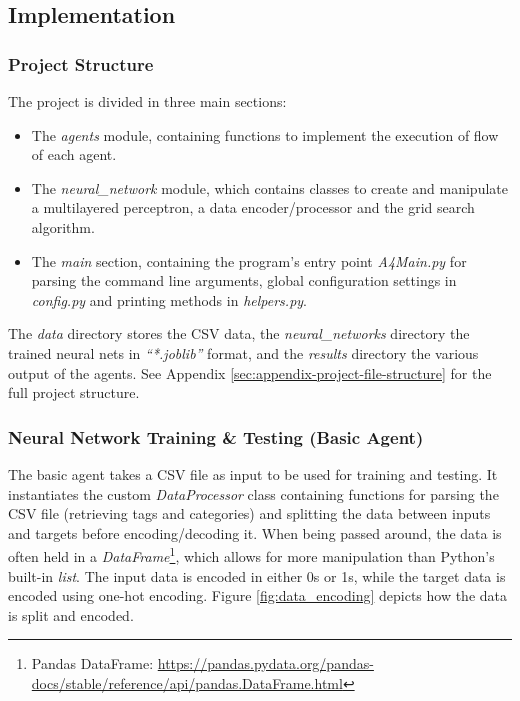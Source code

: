 \documentclass[letterpaper,12pt]{article}
\begin{document}

\subsection{Implementation}

\subsubsection{Project Structure}

The project is divided in three main sections:

\begin{itemize}
    \item The \textit{agents} module, containing functions to implement the execution of flow of each agent.
    \item The \textit{neural\_network} module, which contains classes to create and manipulate a multilayered perceptron, a data encoder/processor and the grid search algorithm.
    \item The \textit{main} section, containing the program's entry point \textit{A4Main.py} for parsing the command line arguments, global configuration settings in \textit{config.py} and printing methods in \textit{helpers.py}.
\end{itemize}

The \textit{data} directory stores the CSV data, the \textit{neural\_networks} directory the trained neural nets in \textit{``*.joblib''} format, and the \textit{results} directory the various output of the agents. See Appendix \ref{sec:appendix-project-file-structure} for the full project structure.


\subsubsection{Neural Network Training \& Testing (Basic Agent)}
\label{sec:basic-agent}

The basic agent takes a CSV file as input to be used for training and testing. It instantiates the custom \textit{DataProcessor} class containing functions for parsing the CSV file (retrieving tags and categories) and splitting the data between inputs and targets before encoding/decoding it. When being passed around, the data is often held in a \textit{DataFrame}\footnote{Pandas DataFrame: \url{https://pandas.pydata.org/pandas-docs/stable/reference/api/pandas.DataFrame.html}}, which allows for more manipulation than Python's built-in \textit{list}. The input data is encoded in either 0s or 1s, while the target data is encoded using one-hot encoding. Figure \ref{fig:data_encoding} depicts how the data is split and encoded.
\end{document}
